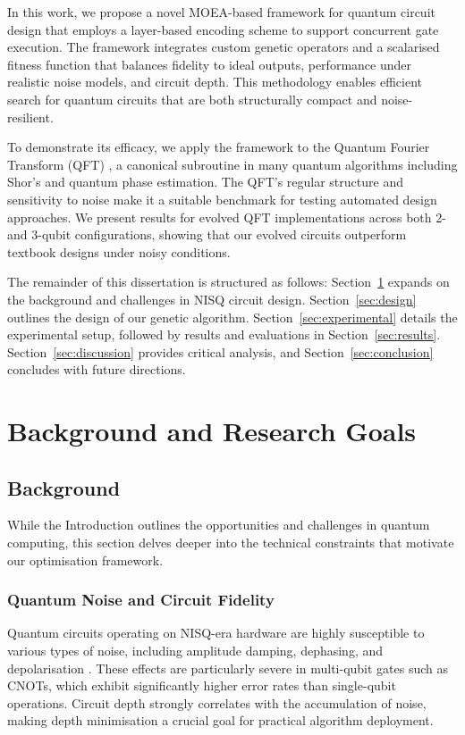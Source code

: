 \documentclass[11pt,a4paper]{article}
\begin{document}
In this work, we propose a novel MOEA-based framework for quantum circuit design that employs a layer-based encoding scheme to support concurrent gate execution. The framework integrates custom genetic operators and a scalarised fitness function that balances fidelity to ideal outputs, performance under realistic noise models, and circuit depth. This methodology enables efficient search for quantum circuits that are both structurally compact and noise-resilient.\newline

To demonstrate its efficacy, we apply the framework to the Quantum Fourier Transform (QFT) \cite{Jozsa1997QuantumAA}, a canonical subroutine in many quantum algorithms including Shor’s and quantum phase estimation. The QFT’s regular structure and sensitivity to noise make it a suitable benchmark for testing automated design approaches. We present results for evolved QFT implementations across both 2- and 3-qubit configurations, showing that our evolved circuits outperform textbook designs under noisy conditions.\newline

The remainder of this dissertation is structured as follows: Section~\ref{sec:background} expands on the background and challenges in NISQ circuit design. Section~\ref{sec:design} outlines the design of our genetic algorithm. Section~\ref{sec:experimental} details the experimental setup, followed by results and evaluations in Section~\ref{sec:results}. Section~\ref{sec:discussion} provides critical analysis, and Section~\ref{sec:conclusion} concludes with future directions.

%
%
\section{Background and Research Goals} \label{sec:background}
\subsection{Background}
While the Introduction outlines the opportunities and challenges in quantum computing, this section delves deeper into the technical constraints that motivate our optimisation framework.

\subsubsection*{Quantum Noise and Circuit Fidelity}
Quantum circuits operating on NISQ-era hardware are highly susceptible to various types of noise, including amplitude damping, dephasing, and depolarisation \cite{Clerk2008IntroductionTQ}. These effects are particularly severe in multi-qubit gates such as CNOTs, which exhibit significantly higher error rates than single-qubit operations. Circuit depth strongly correlates with the accumulation of noise, making depth minimisation a crucial goal for practical algorithm deployment.\newline
\end{document}

